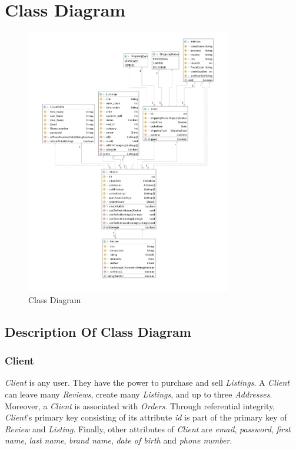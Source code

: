 \documentclass[11pt]{article}
\newcounter{use case ID}
\begin{document}
\section{Class Diagram}
\begin{figure}[ht!]
    \centering
    \includegraphics[width=0.8\textwidth]{Diagrams/Class/class_diagram.png} 
    \caption{Class Diagram}
    \label{fig: Class diagram}
\end{figure}

\subsection{Description Of Class Diagram}
\subsubsection{Client}
\textit{Client} is any user. They have the power to purchase and sell \textit{Listings}. A \textit{Client} can leave many \textit{Reviews}, create many \textit{Listings}, and up to three \textit{Addresses}. Moreover, a \textit{Client} is associated with \textit{Orders}. Through referential integrity, \textit{Client}'s primary key consisting of its attribute \textit{id} is part of the primary key of \textit{Review} and \textit{Listing}. Finally, other attributes of \textit{Client} are \textit{email}, \textit{password}, \textit{first name}, \textit{last name}, \textit{brand name}, \textit{date of birth} and \textit{phone number}.
\end{document}
